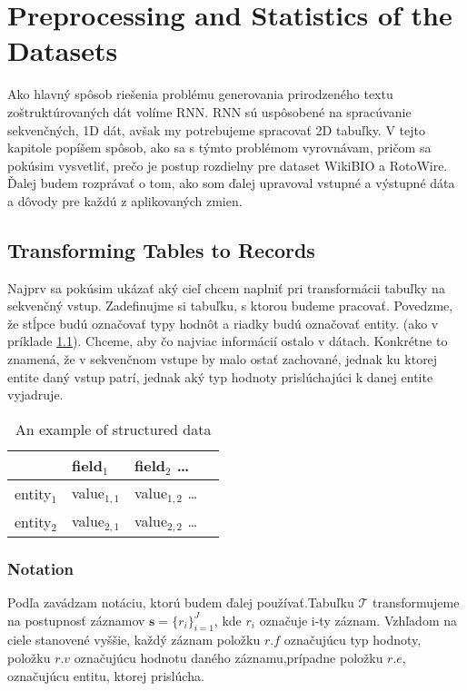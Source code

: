 \chapter{Preprocessing and Statistics of the Datasets} \label{chapPreproc}

Ako hlavný spôsob riešenia problému generovania prirodzeného textu zo\linebreak[4]štruktúrovaných dát volíme RNN. RNN sú uspôsobené na spracúvanie \linebreak[4]sekvenčných, 1D dát, avšak my potrebujeme spracovať 2D tabuľky. V tejto kapitole popíšem spôsob, ako sa s týmto problémom vyrovnávam, pričom sa pokúsim vysvetliť, prečo je postup rozdielny pre dataset WikiBIO a RotoWire. Ďalej budem rozprávať o tom, ako som ďalej upravoval vstupné a výstupné dáta a dôvody pre každú z aplikovaných zmien.

\section{Transforming Tables to Records}

Najprv sa pokúsim ukázať aký cieľ chcem naplniť pri transformácii tabuľky na sekvenčný vstup. Zadefinujme si tabuľku, s ktorou budeme pracovať. Povedzme, že stĺpce budú označovať typy hodnôt a riadky budú označovať entity. (ako v príklade \ref{ex_struct}). Chceme, aby čo najviac informácií ostalo v dátach. Konkrétne to znamená, že v sekvenčnom vstupe by malo ostať zachované, jednak ku ktorej entite daný vstup patrí, jednak aký typ hodnoty prislúchajúci k danej entite vyjadruje.

\begin{table}
    \centering
    \begin{tabular}{llll}
        \toprule
        {} & field$_1$ & field$_2$ \dots \\
        \midrule
        entity$_1$ & value$_{1,1}$ &  value$_{1,2}$ \dots \\
        entity$_2$ & value$_{2,1}$ & value$_{2,2}$ \dots
    \end{tabular}
    \caption{An example of structured data} \label{ex_struct}
\end{table}

\subsection{Notation}

Podľa \citep{liang-etal-2009-learning} zavádzam notáciu, ktorú budem ďalej používať.\linebreak[4]Tabuľku $\mathcal{T}$ transformujeme na postupnosť záznamov $ \mathbf{s} = \{ r_i \}_{i=1}^{J} $, kde $r_i$ označuje i-ty záznam. Vzhľadom na ciele stanovené vyššie, každý záznam položku $r.f$ označujúcu typ hodnoty, položku $r.v$ označujúcu hodnotu daného záznamu,\linebreak[4]prípadne položku $r.e$, označujúcu entitu, ktorej prislúcha.

